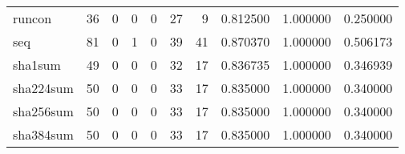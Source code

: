 \begin{longtable}{lrrrrrrrrr}
runcon    &                                        36 &                                                  0 &                                                  0 &                                                  0 &                                                 27 &                                                  9 &                                           0.812500 &                               1.000000 &                             0.250000 \\
seq       &                                        81 &                                                  0 &                                                  1 &                                                  0 &                                                 39 &                                                 41 &                                           0.870370 &                               1.000000 &                             0.506173 \\
sha1sum   &                                        49 &                                                  0 &                                                  0 &                                                  0 &                                                 32 &                                                 17 &                                           0.836735 &                               1.000000 &                             0.346939 \\
sha224sum &                                        50 &                                                  0 &                                                  0 &                                                  0 &                                                 33 &                                                 17 &                                           0.835000 &                               1.000000 &                             0.340000 \\
sha256sum &                                        50 &                                                  0 &                                                  0 &                                                  0 &                                                 33 &                                                 17 &                                           0.835000 &                               1.000000 &                             0.340000 \\
sha384sum &                                        50 &                                                  0 &                                                  0 &                                                  0 &                                                 33 &                                                 17 &                                           0.835000 &                               1.000000 &                             0.340000 \\

\end{longtable}
